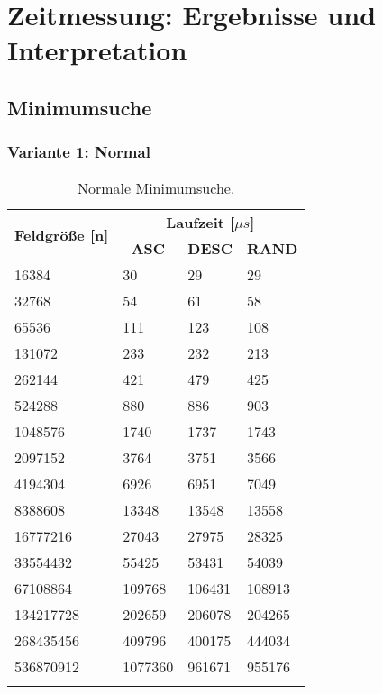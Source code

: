 \section{Zeitmessung: Ergebnisse und Interpretation}

\subsection{Minimumsuche}

\subsubsection{Variante 1: Normal}

\begin{center}
	\begin{longtable}{|p{5cm}|p{3cm}|p{3cm}|p{3cm}|}
		\hline
		
		\multirow{2}{5cm}{\centering \textbf{Feldgröße [n]}} & \multicolumn{3}{|c|}{ \textbf{Laufzeit [$\mu s$]}} \\\cline{2-4}
		& \multicolumn{1}{|c|}{\textbf{ASC}} & \multicolumn{1}{|c|}{\textbf{DESC}} &\multicolumn{1}{|c|}{\textbf{RAND}} \\
		\hhline{|=|=|=|=|}
		
		16384 & 30 & 29 & 29\\
		\hline
		32768 & 54 & 61 & 58\\
		\hline
		65536 & 111 & 123 & 108\\
		\hline
		131072 & 233 & 232 & 213\\
		\hline
		262144 & 421 & 479 & 425\\
		\hline
		524288 & 880 & 886 & 903\\
		\hline
		1048576 & 1740 & 1737 & 1743\\
		\hline
		2097152 & 3764 & 3751 & 3566\\
		\hline
		4194304 & 6926 & 6951 & 7049\\
		\hline
		8388608 & 13348 & 13548 & 13558\\
		\hline
		16777216 & 27043 & 27975 & 28325\\
		\hline
		33554432 & 55425 & 53431 & 54039\\
		\hline
		67108864 & 109768 & 106431 & 108913\\
		\hline
		134217728 & 202659 & 206078 & 204265\\
		\hline
		268435456 & 409796 & 400175 & 444034\\
		\hline
		536870912 & 1077360 & 961671 & 955176\\
		\hline
		
		\caption{Normale Minimumsuche.}
		\label{tab:minimumsearch-v1}
	\end{longtable}
\end{center}


